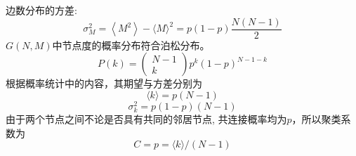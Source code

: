 边数分布的方差:
\begin{equation}
    \sigma_M^2=\left\langle M^2\right\rangle-\langle M\rangle^2=p(1-p) \frac{N(N-1)}{2}
\end{equation}
$G(N, M)$中节点度的概率分布符合泊松分布。
\begin{equation}
    P(k)=\left(\begin{array}{c}
    N-1 \\
    k
    \end{array}\right) p^k(1-p)^{N-1-k}
\end{equation}
根据概率统计中的内容，其期望与方差分别为
\begin{equation}
    \langle k\rangle=p(N-1)
\end{equation}
\begin{equation}
    \sigma_k^2=p(1-p)(N-1)
\end{equation}
由于两个节点之间不论是否具有共同的邻居节点, 共连接概率均为$p$，所以聚类系数为
\begin{equation}
    C=p=\langle k\rangle /(N-1)
\end{equation}
